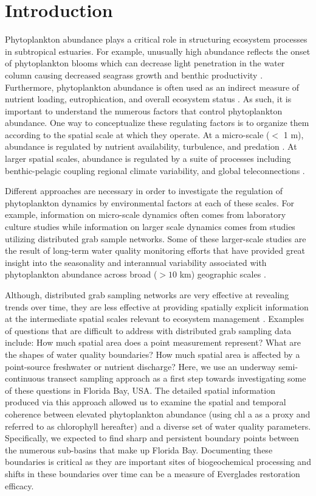 \section{Introduction}
\label{intro}
Phytoplankton abundance plays a critical role in structuring ecosystem processes in subtropical estuaries. For example, unusually high abundance reflects the onset of phytoplankton blooms which can decrease light penetration in the water column causing decreased seagrass growth and benthic productivity \citep{kelble_2005}. Furthermore, phytoplankton abundance is often used as an indirect measure of nutrient loading, eutrophication, and overall ecosystem status \citep{boyer_2009}. As such, it is important to understand the numerous factors that control phytoplankton abundance. One way to conceptualize these regulating factors is to organize them according to the spatial scale at which they operate. At a micro-scale ($<$ 1 m), abundance is regulated by nutrient availability, turbulence, and predation \cite{mann2013dynamics}. At larger spatial scales, abundance is regulated by a suite of processes including benthic-pelagic coupling \cite{zhang_2014} \cite{lawrence2004wind} regional climate variability, and global teleconnections \cite{briceno_climatic_2009}.

Different approaches are necessary in order to investigate the regulation of phytoplankton dynamics by environmental factors at each of these scales. For example, information on micro-scale dynamics often comes from laboratory culture studies while information on larger scale dynamics comes from studies utilizing distributed grab sample networks. Some of these larger-scale studies are the result of long-term water quality monitoring efforts that have provided great insight into the seasonality and interannual variability associated with phytoplankton abundance across broad ($>10$ km) geographic scales \cite{cloern_patterns_2010}.

Although, distributed grab sampling networks are very effective at revealing trends over time, they are less effective at providing spatially explicit information at the intermediate spatial scales relevant to ecosystem management \cite{anttila2008feasible}. Examples of questions that are difficult to address with distributed grab sampling data include: How much spatial area does a point measurement represent? What are the shapes of water quality boundaries? How much spatial area is affected by a point-source freshwater or nutrient discharge? Here, we use an underway semi-continuous transect sampling approach as a first step towards investigating some of these questions in Florida Bay, USA. The detailed spatial information produced via this approach allowed us to examine the spatial and temporal coherence between elevated phytoplankton abundance (using chl a as a proxy and referred to as chlorophyll hereafter) and a diverse set of water quality parameters. Specifically, we expected to find sharp and persistent boundary points between the numerous sub-basins that make up Florida Bay. Documenting these boundaries is critical as they are important sites of biogeochemical processing and shifts in these boundaries over time can be a measure of Everglades restoration efficacy.
